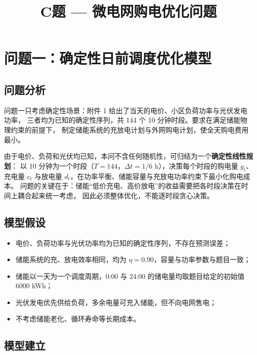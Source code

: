 \documentclass[12pt,a4paper]{article}
\title{C题 --- 微电网购电优化问题}
\date{}
\begin{document}
\maketitle

\section{问题一：确定性日前调度优化模型}

\subsection{问题分析}

问题一只考虑确定性场景：附件 1 给出了当天的电价、小区负荷功率与光伏发电功率，
三者均为已知的确定性序列，共 144 个 10 分钟时段。要求在满足储能物理约束的前提下，
制定储能系统的充放电计划与外网购电计划，使全天购电费用最小。

由于电价、负荷和光伏均已知，本问不含任何随机性，可归结为一个\textbf{确定性线性规划}：
以 10 分钟为一个时段（$T=144$，$\Delta t = 1/6$ h），决策每个时段的购电量 $g_t$、
充电量 $c_t$ 与放电量 $d_t$，在功率平衡、储能容量与充放电功率约束下最小化购电成本。
问题的关键在于：储能“低价充电、高价放电”的收益需要把各时段决策在时间上耦合起来统一考虑，
因此必须整体优化，不能逐时段贪心决策。

\subsection{模型假设}

\begin{itemize}
    \item 电价、负荷功率与光伏功率均为已知的确定性序列，不存在预测误差；
    \item 储能系统的充、放电效率相同，均为 $\eta = 0.90$，容量与功率参数与题目一致；
    \item 储能以一天为一个调度周期，0:00 与 24:00 的储电量均取题目给定的初始值 6000 kWh；
    \item 光伏发电优先供给负荷，多余电量可充入储能，但不向电网售电；
    \item 不考虑储能老化、循环寿命等长期成本。
\end{itemize}

\subsection{模型建立}
\end{document}
